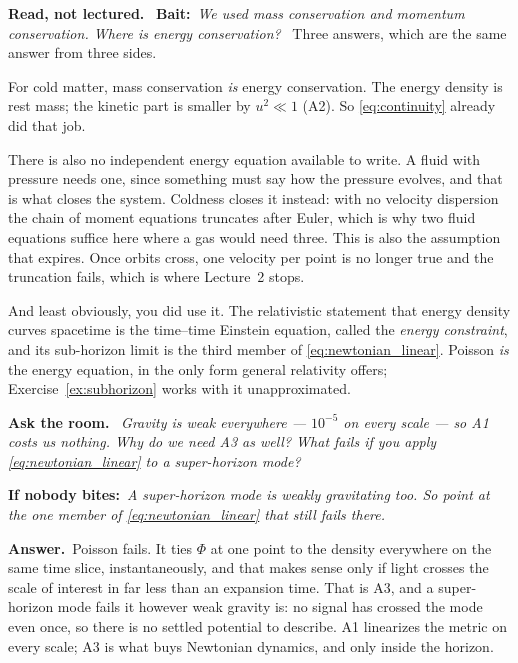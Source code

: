 \documentclass[a4paper,11pt]{article}
\numberwithin{equation}{section}
\newenvironment{reading}
  {\par\medskip\noindent\begingroup\small\color{black!58}%
   \textbf{Read, not lectured.}\ }
  {\endgroup\par\medskip}
\newenvironment{quiz}
  {\par\medskip\noindent\begingroup\small\color{RoyalBlue!65!black}%
   \textbf{Ask the room.}\ \itshape}
  {\endgroup\par\medskip}
\newcommand{\nudge}[1]{\upshape\par\smallskip\hspace*{1.2em}\textbf{If nobody bites:}\ \itshape #1}
\newcommand{\answer}[1]{\upshape\par\smallskip\hspace*{1.2em}\textbf{Answer.}\ #1}
\newcommand{\bait}[1]{\textbf{Bait:}\ \emph{#1}\ }
\begin{document}
\begin{reading}
\bait{We used mass conservation and momentum conservation. Where is energy
conservation?}
Three answers, which are the same answer from three sides.

For cold matter, mass conservation \emph{is} energy conservation. The energy
density is rest mass; the kinetic part is smaller by $u^2 \ll 1$ (A2). So
\eqref{eq:continuity} already did that job.

There is also no independent energy equation available to write. A fluid with pressure needs one, since something must say how the pressure evolves, and that is
what closes the system. Coldness closes it instead: with no velocity dispersion
the chain of moment equations truncates after Euler, which is why two fluid
equations suffice here where a gas would need three. This is also the assumption
that expires. Once orbits cross, one velocity per point is no longer true and
the truncation fails, which is where Lecture~2 stops.

And least obviously, you did use it. The relativistic statement that energy
density curves spacetime is the time--time Einstein equation, called the \emph{energy constraint}, and its sub-horizon limit is the third member of
\eqref{eq:newtonian_linear}. Poisson \emph{is} the energy equation, in the only
form general relativity offers; Exercise~\ref{ex:subhorizon} works with it
unapproximated.
\end{reading}

\begin{quiz}
Gravity is weak \emph{everywhere} --- $10^{-5}$ on every scale --- so A1 costs
us nothing. Why do we need A3 as well? What fails if you apply
\eqref{eq:newtonian_linear} to a super-horizon mode?
\nudge{A super-horizon mode is weakly gravitating too. So point at the one
member of \eqref{eq:newtonian_linear} that still fails there.}
\answer{Poisson fails. It ties $\Phi$ at one point to the density everywhere on
the same time slice, instantaneously, and that makes sense only if light crosses
the scale of interest in far less than an expansion time. That is A3, and a
super-horizon mode fails it however weak gravity is: no signal has crossed the
mode even once, so there is no settled potential to describe. A1 linearizes the
metric on every scale; A3 is what buys Newtonian dynamics, and only inside the
horizon.}
\end{quiz}
\end{document}
